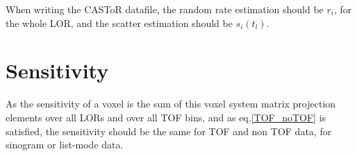 \documentclass[a4paper, 11pt]{article}
\begin{document}
When writing the CASToR datafile, the random rate estimation should be $r_i$, for the whole LOR, and the scatter estimation should be $s_i(t_l)$.

\section{Sensitivity}

As the sensitivity of a voxel is the sum of this voxel system matrix projection elements over all LORs and over all TOF bins, and as eq.\ref{TOF_noTOF} is satisfied, the sensitivity should be the same for TOF and non TOF data, for sinogram or list-mode data. 
\end{document}

